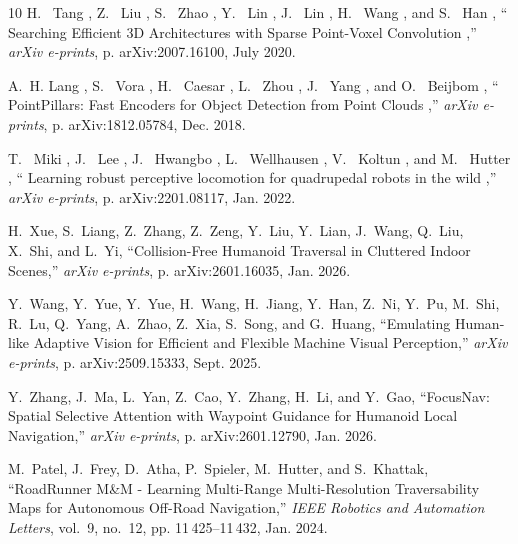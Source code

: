 \documentclass[letterpaper, 10 pt, conference]{ieeeconf/ieeeconf}
\providecommand{\DIFadd}[1]{{\protect\color{blue} \sf #1}} %
\providecommand{\DIFaddbegin}{} %
\providecommand{\DIFaddend}{} %
\begin{document}
\begin{thebibliography}{10}
\DIFaddbegin {}
\DIFadd{H.~}{\DIFadd{Tang}}\DIFadd{, Z.~}{\DIFadd{Liu}}\DIFadd{, S.~}{\DIFadd{Zhao}}\DIFadd{, Y.~}{\DIFadd{Lin}}\DIFadd{, J.~}{\DIFadd{Lin}}\DIFadd{, H.~}{\DIFadd{Wang}}\DIFadd{, and S.~}{\DIFadd{Han}}\DIFadd{,
  ``}{\DIFadd{Searching Efficient 3D Architectures with Sparse Point-Voxel
  Convolution}}\DIFadd{,'' \emph{arXiv e-prints}, p. arXiv:2007.16100, July 2020.
}

\DIFadd{A.~H. }{\DIFadd{Lang}}\DIFadd{, S.~}{\DIFadd{Vora}}\DIFadd{, H.~}{\DIFadd{Caesar}}\DIFadd{, L.~}{\DIFadd{Zhou}}\DIFadd{, J.~}{\DIFadd{Yang}}\DIFadd{, and O.~}{\DIFadd{Beijbom}}\DIFadd{,
  ``}{\DIFadd{PointPillars: Fast Encoders for Object Detection from Point Clouds}}\DIFadd{,''
  \emph{arXiv e-prints}, p. arXiv:1812.05784, Dec. 2018.
}

\DIFadd{T.~}{\DIFadd{Miki}}\DIFadd{, J.~}{\DIFadd{Lee}}\DIFadd{, J.~}{\DIFadd{Hwangbo}}\DIFadd{, L.~}{\DIFadd{Wellhausen}}\DIFadd{, V.~}{\DIFadd{Koltun}}\DIFadd{, and
  M.~}{\DIFadd{Hutter}}\DIFadd{, ``}{\DIFadd{Learning robust perceptive locomotion for quadrupedal robots
  in the wild}}\DIFadd{,'' \emph{arXiv e-prints}, p. arXiv:2201.08117, Jan. 2022.
}

\DIFaddend {}
H.~{Xue}, S.~{Liang}, Z.~{Zhang}, Z.~{Zeng}, Y.~{Liu}, Y.~{Lian}, J.~{Wang},
  Q.~{Liu}, X.~{Shi}, and L.~{Yi}, ``{Collision-Free Humanoid Traversal in
  Cluttered Indoor Scenes},'' \emph{arXiv e-prints}, p. arXiv:2601.16035, Jan.
  2026.

Y.~{Wang}, Y.~{Yue}, Y.~{Yue}, H.~{Wang}, H.~{Jiang}, Y.~{Han}, Z.~{Ni},
  Y.~{Pu}, M.~{Shi}, R.~{Lu}, Q.~{Yang}, A.~{Zhao}, Z.~{Xia}, S.~{Song}, and
  G.~{Huang}, ``{Emulating Human-like Adaptive Vision for Efficient and
  Flexible Machine Visual Perception},'' \emph{arXiv e-prints}, p.
  arXiv:2509.15333, Sept. 2025.

Y.~{Zhang}, J.~{Ma}, L.~{Yan}, Z.~{Cao}, Y.~{Zhang}, H.~{Li}, and Y.~{Gao},
  ``{FocusNav: Spatial Selective Attention with Waypoint Guidance for Humanoid
  Local Navigation},'' \emph{arXiv e-prints}, p. arXiv:2601.12790, Jan. 2026.

M.~{Patel}, J.~{Frey}, D.~{Atha}, P.~{Spieler}, M.~{Hutter}, and S.~{Khattak},
  ``{RoadRunner M\&M - Learning Multi-Range Multi-Resolution Traversability
  Maps for Autonomous Off-Road Navigation},'' \emph{IEEE Robotics and
  Automation Letters}, vol.~9, no.~12, pp. 11\,425--11\,432, Jan. 2024.


\end{thebibliography}
\end{document}
